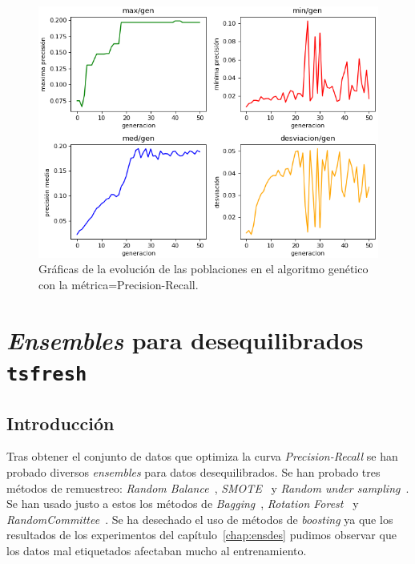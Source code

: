 \documentclass[a4paper,12pt,twoside,oldfontcommands]{memoir}
\begin{document}
\begin{figure}
    \centering
    \includegraphics[width=1\textwidth]{images/genetico2.png}
    \caption{Gráficas de la evolución de las poblaciones en el algoritmo genético con la métrica=Precision-Recall.}
    \label{fig:genetico2}
\end{figure}

\chapter{\textit{Ensembles} para desequilibrados \texttt{tsfresh}}
\section{Introducción}
Tras obtener el conjunto de datos que optimiza la curva \textit{Precision-Recall} se han probado diversos \textit{ensembles} para datos desequilibrados. Se han probado tres métodos de remuestreo: \textit{Random Balance}~\cite{diez2015random}, \textit{SMOTE}~\cite{galar2012review} y \textit{Random under sampling}~\cite{diez2015diversity}. Se han usado justo a estos los métodos de \textit{Bagging}~\cite{galar2012review}, \textit{Rotation Forest}~\cite{rodriguez2006rotation} y \textit{RandomCommittee}~\cite{diez2015diversity}. Se ha desechado el uso de métodos de \textit{boosting} ya que los resultados de los experimentos del capítulo~\ref{chap:ensdes} pudimos observar que los datos mal etiquetados afectaban mucho al entrenamiento.
\end{document}
